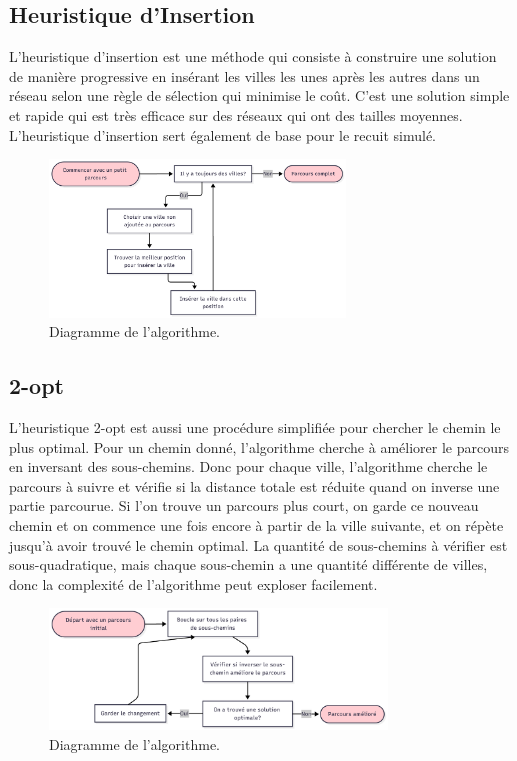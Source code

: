 \documentclass[a4paper,11pt,fleqn]{article}
\begin{document}
\subsection*{Heuristique d’Insertion}
L'heuristique d'insertion \cite{article:insert} est une méthode qui consiste à construire une solution de manière progressive en insérant les villes les unes après les autres dans un réseau selon une règle de sélection qui minimise le coût. C'est une solution simple et rapide qui est très efficace sur des réseaux qui ont des tailles moyennes. L'heuristique d'insertion sert également de base pour le recuit simulé.

\begin{figure}[H]
    \centering
    \includegraphics[width=0.7\textwidth]{images/charte-insert.png}
    \caption{Diagramme de l'algorithme.}
    \label{fig:charte-insert}
\end{figure}

\subsection*{2-opt}
L'heuristique 2-opt \cite{article:2opt} est aussi une procédure simplifiée pour chercher le chemin le plus optimal. Pour un chemin donné, l'algorithme cherche à améliorer le parcours en inversant des sous-chemins. Donc pour chaque ville, l'algorithme cherche le parcours à suivre et vérifie si la distance totale est réduite quand on inverse une partie parcourue. Si l'on trouve un parcours plus court, on garde ce nouveau chemin et on commence une fois encore à partir de la ville suivante, et on répète jusqu'à avoir trouvé le chemin optimal. La quantité de sous-chemins à vérifier est sous-quadratique, mais chaque sous-chemin a une quantité différente de villes, donc la complexité de l'algorithme peut exploser facilement.

\begin{figure}[H]
    \centering
    \includegraphics[width=0.8\textwidth]{images/chart-2opt.png}
    \caption{Diagramme de l'algorithme.}
    \label{fig:charte-2opt}
\end{figure}
\end{document}
